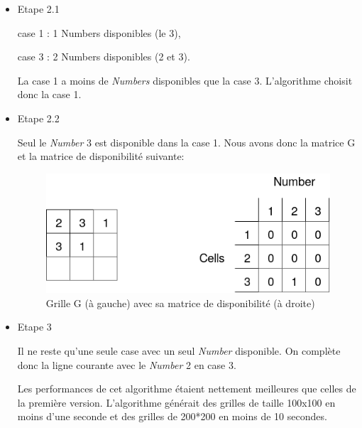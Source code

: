 \documentclass[1]{report}
\begin{document}
\begin{itemize}
            \item{Etape 2.1} \newline

            case 1 : 1 Numbers disponibles (le 3),
            
            case 3 : 2 Numbers disponibles (2 et 3). \newline
            
            La case 1 a moins de \textit{Numbers} disponibles que la case 3. L'algorithme choisit donc la case 1. \newline

            \item{Etape 2.2} \newline

            Seul le \textit{Number} 3 est disponible dans la case 1. Nous avons donc la matrice G et la matrice de disponibilité suivante: \newline

            \begin{figure}[H]
                \centering
                    \includegraphics[scale=0.4]{disponibility3.PNG}
                    \caption{Grille G (à gauche) avec sa matrice de disponibilité (à droite)}
            \end{figure}

            \item{Etape 3} \newline

            Il ne reste qu'une seule case avec un seul \textit{Number} disponible. On complète donc la ligne courante avec le \textit{Number} 2 en case 3. \newline

            Les performances de cet algorithme étaient nettement meilleures que celles de la première version. L'algorithme générait des grilles de taille 100x100 en moins d'une seconde et des grilles de 200*200 en moins de 10 secondes. \newline 
            

\end{itemize}
\end{document}
